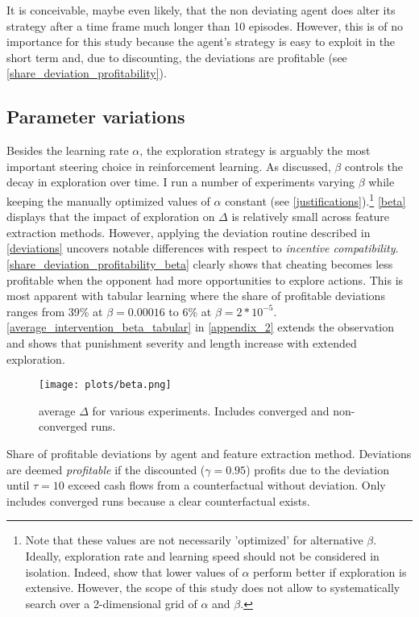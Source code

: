 It is conceivable, maybe even likely, that the non deviating agent does alter its strategy after a time frame much longer than 10 episodes. However, this is of no importance for this study because the agent's strategy is easy to exploit in the short term and, due to discounting, the deviations are profitable (see \autoref{share_deviation_profitability}).


\subsection{Parameter variations}\label{vary_parameter}

Besides the learning rate $\alpha$, the exploration strategy is arguably the most important steering choice in reinforcement learning. As discussed, $\beta$ controls the decay in exploration over time. I run a number of experiments varying $\beta$ while keeping the manually optimized values of $\alpha$ constant (see \autoref{justifications}).\footnote{Note that these values are not necessarily 'optimized' for alternative $\beta$. Ideally, exploration rate and learning speed should not be considered in isolation. Indeed, \textcite{calvano_algorithmic_2018} show that lower values of $\alpha$ perform better if exploration is extensive. However, the scope of this study does not allow to systematically search over a 2-dimensional grid of $\alpha$ and $\beta$.} \autoref{beta} displays that the impact of exploration on $\Delta$ is relatively small across feature extraction methods. However, applying the deviation routine described in \autoref{deviations} uncovers notable differences with respect to \emph{incentive compatibility}. \autoref{share_deviation_profitability_beta} clearly shows that cheating becomes less profitable when the opponent had more opportunities to explore actions. This is most apparent with tabular learning where the share of profitable deviations ranges from 39\% at $\beta = 0.00016$ to 6\% at $\beta= 2*10^{-5}$. \autoref{average_intervention_beta_tabular} in \autoref{appendix_2} extends the observation and shows that punishment severity and length increase with extended exploration.

\begin{figure}
	\texttt{[image: plots/beta.png]}
	\caption{average $\Delta$ for various experiments. Includes converged and non-converged runs.}
	\label{beta}
\end{figure}


\begin{center}
	\begin{table}
		
		\caption{Share of profitable deviations by agent and feature extraction method. Deviations are deemed \emph{profitable} if the discounted ($\gamma = 0.95$) profits due to the deviation until $\tau = 10$  exceed cash flows from a counterfactual without deviation. Only includes converged runs because a clear counterfactual exists.}
		\label{share_deviation_profitability_beta}
	\end{table}
\end{center}

